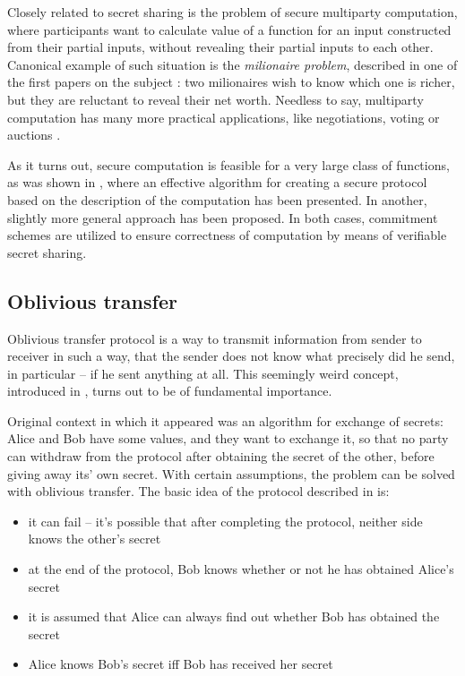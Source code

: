 \documentclass[10pt]{article}
\begin{document}
Closely related to secret sharing is the problem of secure multiparty computation, where participants
want to calculate value of a function for an input constructed from their partial inputs, without
revealing their partial inputs to each other. Canonical example of such situation is the \emph{milionaire
problem}, described in one of the first papers on the subject \cite{Yao}: two milionaires wish to
know which one is richer, but they are reluctant to reveal their net worth. Needless to say, multiparty
computation has many more practical applications, like negotiations, voting or auctions \cite{grigoriev}.

As it turns out, secure computation is feasible for a very large class of functions, as was shown in
\cite{Goldreich87}, where an effective algorithm for creating a secure protocol based on the description
of the computation has been presented. In \cite{Chaum88} another, slightly more general approach has
been proposed. In both cases, commitment schemes are utilized to ensure correctness of computation by
means of verifiable secret sharing. 

\subsection{Oblivious transfer}

Oblivious transfer protocol is a way to transmit information from sender to receiver in such a way,
that the sender does not know what precisely did he send, in particular -- if he sent anything at all.
This seemingly weird concept, introduced in \cite{Rabin81}, turns out to be of fundamental importance.

Original context in which it appeared was an algorithm for exchange of secrets: Alice and Bob have some
values, and they want to exchange it, so that no party can withdraw from the protocol after obtaining
the secret of the other, before giving away its' own secret. With certain assumptions, the problem
can be solved with oblivious transfer. The basic idea of the protocol described in \cite{Rabin81} is:

\begin{itemize}
  \item it can fail -- it's possible that after completing the protocol, neither side knows 
    the other's secret
  \item at the end of the protocol, Bob knows whether or not he has obtained Alice's secret
  \item it is assumed that Alice can always find out whether Bob has obtained the secret
  \item Alice knows Bob's secret iff Bob has received her secret
\end{itemize}
\end{document}
